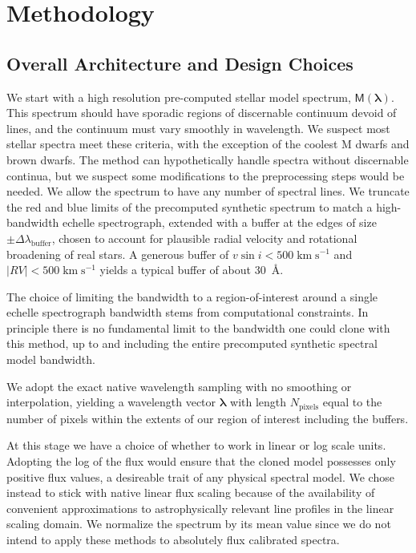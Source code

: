 \documentclass[modern]{aastex631}
\def\kmps{\mathrm{km}\;\mathrm{s}^{-1}}
\begin{document}
\section{Methodology}

\subsection{Overall Architecture and Design Choices}

We start with a high resolution pre-computed stellar model spectrum, $\mathsf{M}(\bm{\lambda})$.  This spectrum should have sporadic regions of discernable continuum devoid of lines, and the continuum must vary smoothly in wavelength.  We suspect most stellar spectra meet these criteria, with the exception of the coolest M dwarfs and brown dwarfs.  The method can hypothetically handle spectra without discernable continua, but we suspect some modifications to the preprocessing steps would be needed.  We allow the spectrum to have any number of spectral lines.  We truncate the red and blue limits of the precomputed synthetic spectrum to match a high-bandwidth echelle spectrograph, extended with a buffer at the edges of size $\pm \Delta \lambda_{\mathrm{buffer}}$, chosen to account for plausible radial velocity and rotational broadening of real stars.  A generous buffer of $v \sin{i} < 500 \;\kmps$ and $|RV|<500 \;\kmps$ yields a typical buffer of about 30~\AA.

The choice of limiting the bandwidth to a region-of-interest around a single echelle spectrograph bandwidth stems from computational constraints.  In principle there is no fundamental limit to the bandwidth one could clone with this method, up to and including the entire precomputed synthetic spectral model bandwidth.

We adopt the exact native wavelength sampling with no smoothing or interpolation, yielding a wavelength vector $\bm{\lambda}$ with length $N_\mathrm{pixels}$ equal to the number of pixels within the extents of our region of interest including the buffers.

At this stage we have a choice of whether to work in linear or log scale units.  Adopting the log of the flux would ensure that the cloned model possesses only positive flux values, a desireable trait of any physical spectral model.  We chose instead to stick with native linear flux scaling because of the availability of convenient approximations to astrophysically relevant line profiles in the linear scaling domain.  We normalize the spectrum by its mean value since we do not intend to apply these methods to absolutely flux calibrated spectra.
\end{document}
